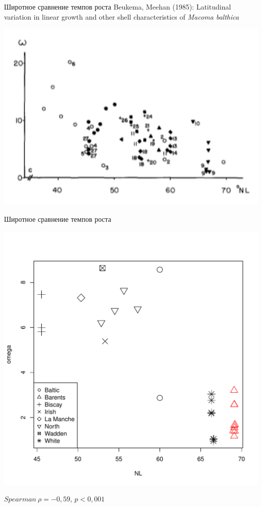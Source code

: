 \documentclass{beamer}
\begin{document}
\begin{frame}{Широтное сравнение темпов роста}
Beukema, Meehan (1985): Latitudinal variation in linear growth and other shell characteristics of {\it Macoma balthica}
 \begin{center}
			\includegraphics[height=.7\textheight]{from_Bukma_Meehan_1985.pdf}
 \end{center}
\end{frame}

\begin{frame}{Широтное сравнение темпов роста}
 \begin{center}
			\includegraphics[height=.7\textheight]{long_vs_omega_big.pdf}
 \end{center}
$Spearman\ \rho = -0,59$, $p < 0,001$

\end{frame}
\end{document}
